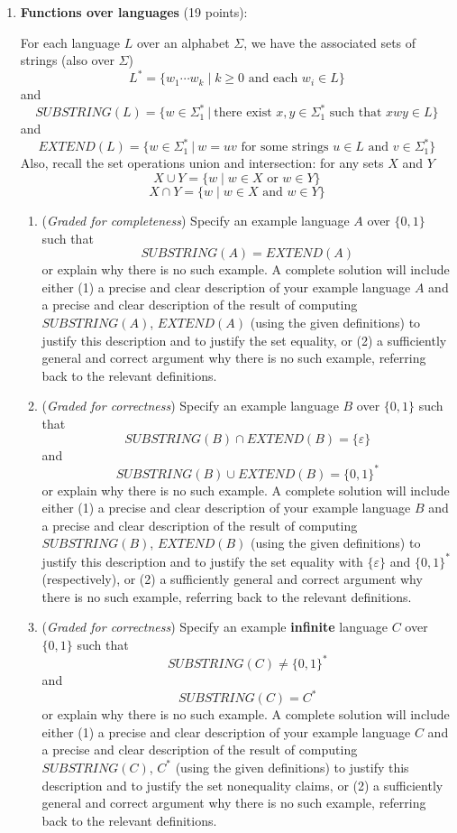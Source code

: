 \documentclass[12pt, oneside]{article}
\newcommand{\gradeCorrect}{({\it Graded for correctness}) }
\newcommand{\gradeComplete}{({\it Graded for completeness}) }
\begin{document}
\begin{enumerate}[wide, labelwidth=!, labelindent=0pt]
\item\textbf{Functions over languages} (19 points):

For each language $L$ over an alphabet $\Sigma$, we have the 
associated sets of strings (also over $\Sigma$)
\[
    L^* = \{ w_1 \cdots w_k \mid k \geq 0 \textrm{ and each } w_i \in L\}
\]
and
\[
    SUBSTRING(L) = \{ w \in \Sigma_1^* ~|~ \text{there exist } x,y \in \Sigma_1^* \text{ such that } xwy \in L\}
\]
and 
\[
    EXTEND(L) = \{ w \in \Sigma_1^* ~|~ w = uv \text{ for some strings } u \in L \text{ and } v \in \Sigma_1^* \}
\]
Also, recall the set operations union and intersection: for any sets $X$ and $Y$
\[
X \cup Y = \{ w \mid w \in X \text{ or } w \in Y \}
\]
\[
X \cap Y = \{ w \mid w \in X \text{ and } w \in Y \}
\]

    \begin{enumerate}
    \item\gradeComplete Specify an example language $A$ over $\{0,1\}$ such that 
    $$SUBSTRING(A) = EXTEND(A)$$
    or explain why there is no such example. 
    A complete solution will include either (1) a precise and
    clear description of your example language $A$ 
    and a precise and clear description of
    the result of computing $SUBSTRING(A)$, $EXTEND(A)$ (using the given definitions)
    to justify this description and to justify the set equality,
    or (2) a sufficiently general and correct argument
    why there is no such example, referring back to the relevant definitions.

    \item\gradeCorrect Specify an example language $B$ over $\{0,1\}$ such that 
    $$SUBSTRING(B) \cap EXTEND(B) = \{\varepsilon\}$$ and $$SUBSTRING(B) \cup EXTEND(B) = \{0,1\}^*$$
    or explain why there is no such example. 
    A complete solution will include either (1) a precise and
    clear description of your example language $B$ 
    and a precise and clear description of
    the result of computing $SUBSTRING(B)$, $EXTEND(B)$ (using the given definitions)
    to justify this description and to justify the set equality with 
    $\{\varepsilon\}$ and $\{0,1\}^*$ (respectively), or (2) a sufficiently general and correct argument
    why there is no such example, referring back to the relevant definitions.

    \item\gradeCorrect Specify an example {\bf infinite} language $C$ over $\{0,1\}$ such that 
    $$SUBSTRING(C) \neq \{0,1\}^*$$ and $$SUBSTRING(C) = C^*$$or 
    explain why there is no such example.
    A complete solution will include either (1) a precise and
    clear description of your example language $C$ 
    and a precise and clear description of
    the result of computing $SUBSTRING(C)$, $C^*$ (using the given definitions)
    to justify this description and to justify the set nonequality claims, 
    or (2) a sufficiently general and correct argument
    why there is no such example, referring back to the relevant definitions.



\end{enumerate}
\end{enumerate}
\end{document}
